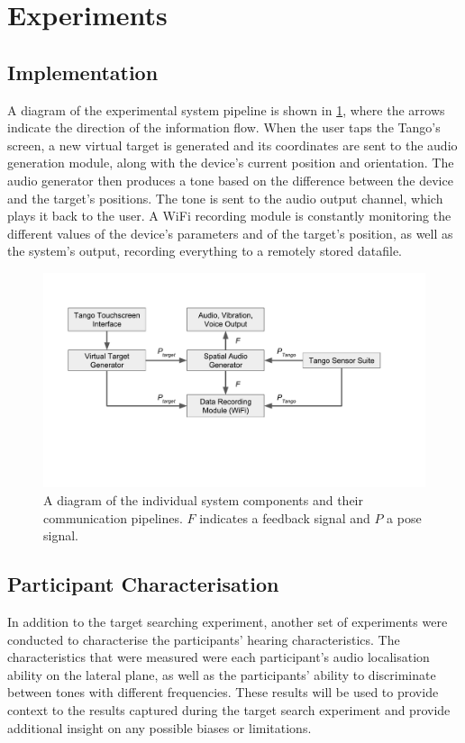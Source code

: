 \documentclass[]{interact}
\begin{document}
\section{Experiments}\label{sec:experiments}

\subsection{Implementation}

A diagram of the experimental system pipeline is shown in \cref{fig:pipeline}, where the arrows indicate the direction of the information flow.
When the user taps the Tango's screen, a new virtual target is generated and its coordinates are sent to the audio generation module, along with the device's current position and orientation.
The audio generator then produces a tone based on the difference between the device and the target's positions. The tone is sent to the audio output channel, which plays it back to the user.
A WiFi recording module is constantly monitoring the different values of the device's parameters and of the target's position, as well as the system's output, recording everything to a remotely stored datafile. 

\begin{figure}[t]
  \centering
  \includegraphics[clip=true, trim=0 120 80 50, width=0.9\columnwidth]{figures/pipeline.pdf}
  \caption{A diagram of the individual system components and their communication pipelines. $F$ indicates a feedback signal and $P$ a pose signal. }\label{fig:pipeline}
\end{figure}

\subsection{Participant Characterisation}

In addition to the target searching experiment, another set of experiments were conducted to characterise the participants' hearing characteristics.
The characteristics that were measured were each participant's audio localisation ability on the lateral plane, as well as the participants' ability to discriminate between tones with different frequencies. 
These results will be used to provide context to the results captured during the target search experiment and provide additional insight on any possible biases or limitations. 
\end{document}
